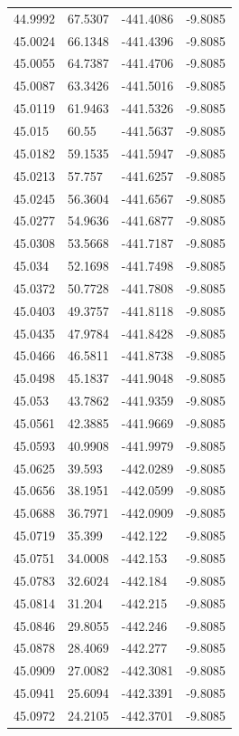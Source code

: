 \begin{table}[H]
\begin{tabular}{llll}
44.9992 & 67.5307 & -441.4086 & -9.8085 \\
45.0024 & 66.1348 & -441.4396 & -9.8085 \\
45.0055 & 64.7387 & -441.4706 & -9.8085 \\
45.0087 & 63.3426 & -441.5016 & -9.8085 \\
45.0119 & 61.9463 & -441.5326 & -9.8085 \\
45.015 & 60.55 & -441.5637 & -9.8085 \\
45.0182 & 59.1535 & -441.5947 & -9.8085 \\
45.0213 & 57.757 & -441.6257 & -9.8085 \\
45.0245 & 56.3604 & -441.6567 & -9.8085 \\
45.0277 & 54.9636 & -441.6877 & -9.8085 \\
45.0308 & 53.5668 & -441.7187 & -9.8085 \\
45.034 & 52.1698 & -441.7498 & -9.8085 \\
45.0372 & 50.7728 & -441.7808 & -9.8085 \\
45.0403 & 49.3757 & -441.8118 & -9.8085 \\
45.0435 & 47.9784 & -441.8428 & -9.8085 \\
45.0466 & 46.5811 & -441.8738 & -9.8085 \\
45.0498 & 45.1837 & -441.9048 & -9.8085 \\
45.053 & 43.7862 & -441.9359 & -9.8085 \\
45.0561 & 42.3885 & -441.9669 & -9.8085 \\
45.0593 & 40.9908 & -441.9979 & -9.8085 \\
45.0625 & 39.593 & -442.0289 & -9.8085 \\
45.0656 & 38.1951 & -442.0599 & -9.8085 \\
45.0688 & 36.7971 & -442.0909 & -9.8085 \\
45.0719 & 35.399 & -442.122 & -9.8085 \\
45.0751 & 34.0008 & -442.153 & -9.8085 \\
45.0783 & 32.6024 & -442.184 & -9.8085 \\
45.0814 & 31.204 & -442.215 & -9.8085 \\
45.0846 & 29.8055 & -442.246 & -9.8085 \\
45.0878 & 28.4069 & -442.277 & -9.8085 \\
45.0909 & 27.0082 & -442.3081 & -9.8085 \\
45.0941 & 25.6094 & -442.3391 & -9.8085 \\
45.0972 & 24.2105 & -442.3701 & -9.8085 \\

\end{tabular}
\end{table}
